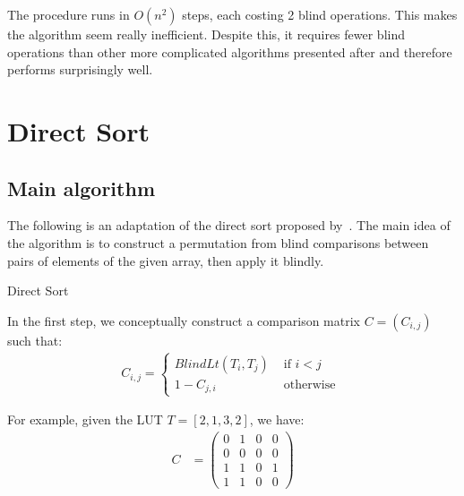 \documentclass{article}
\begin{document}
The procedure runs in $O(n^2)$ steps, each costing 2 blind operations. This makes the algorithm seem really inefficient. Despite this, it requires fewer blind operations than other more complicated algorithms presented after and therefore performs surprisingly well.

\newpage

\section{Direct Sort}

\subsection{Main algorithm}

The following is an adaptation of the direct sort proposed by~\cite{lauter_depth_2015}. The main idea of the algorithm is to construct a permutation from blind comparisons between pairs of elements of the given array, then apply it blindly.

\begin{algorithm}
    \caption{Direct Sort}
    \begin{algorithmic}
            \State{$\sigma \gets [0, \dots, 0]$}
                \EndFor{}
            \EndFor{}

        \EndFunction{}
    \end{algorithmic}
\end{algorithm}

In the first step, we conceptually construct a comparison matrix $C = (C_{i, j})$ such that:
\begin{align*}
    C_{i, j} = \begin{cases}
        BlindLt(T_i, T_j) & \text{ if } i < j \\
        1 - C_{j, i} & \text{ otherwise }
    \end{cases}
\end{align*}

For example, given the LUT $T = [2, 1, 3, 2]$, we have:
\begin{align*}
    C &= \begin{pmatrix}
        0 & 1 & 0 & 0 \\
        0 & 0 & 0 & 0 \\
        1 & 1 & 0 & 1 \\
        1 & 1 & 0 & 0
    \end{pmatrix}
\end{align*}
\end{document}
